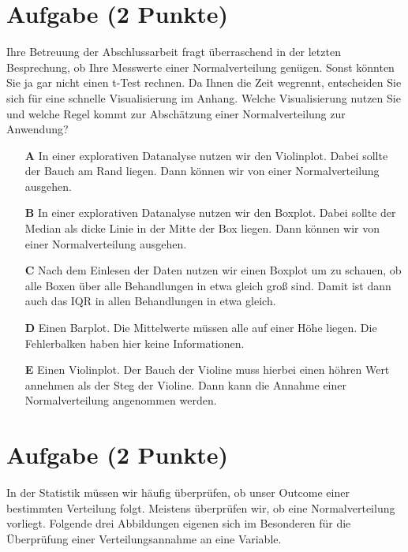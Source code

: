\documentclass[a4paper, 9pt]{scrartcl}\usepackage[]{graphicx}\usepackage[]{xcolor}
\begin{document}
\section{Aufgabe \hfill (2 Punkte)}



Ihre Betreuung der Abschlussarbeit fragt überraschend in der letzten Besprechung, ob Ihre Messwerte einer Normalverteilung genügen. Sonst könnten Sie ja gar nicht einen t-Test rechnen. Da Ihnen die Zeit wegrennt, entscheiden Sie sich für eine schnelle Visualisierung im Anhang. Welche Visualisierung nutzen Sie und welche Regel kommt zur Abschätzung einer Normalverteilung zur Anwendung?



\begin{enumerate}
\item [\textbf{A} \msquare] In einer explorativen Datanalyse nutzen wir den Violinplot. Dabei sollte der Bauch am Rand liegen. Dann können wir von einer Normalverteilung ausgehen.
\item [\textbf{B} \msquare] In einer explorativen Datanalyse nutzen wir den Boxplot. Dabei sollte der Median als dicke Linie in der Mitte der Box liegen. Dann können wir von einer Normalverteilung ausgehen.
\item [\textbf{C} \msquare] Nach dem Einlesen der Daten nutzen wir einen Boxplot um zu schauen, ob alle Boxen über alle Behandlungen in etwa gleich groß sind. Damit ist dann auch das IQR in allen Behandlungen in etwa gleich.
\item [\textbf{D} \msquare] Einen Barplot. Die Mittelwerte müssen alle auf einer Höhe liegen. Die Fehlerbalken haben hier keine Informationen.
\item [\textbf{E} \msquare] Einen Violinplot. Der Bauch der Violine muss hierbei einen höhren Wert annehmen als der Steg der Violine. Dann kann die Annahme einer Normalverteilung angenommen werden.
\end{enumerate}

\section{Aufgabe \hfill (2 Punkte)}




In der Statistik müssen wir häufig überprüfen, ob unser Outcome einer bestimmten Verteilung folgt. Meistens überprüfen wir, ob eine
Normalverteilung vorliegt. Folgende drei Abbildungen eigenen sich im Besonderen für die Überprüfung einer Verteilungsannahme an eine Variable.
\end{document}
